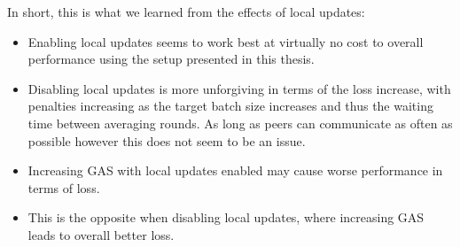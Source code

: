 In short, this is what we learned from the effects of local updates:
\begin{itemize}
    \item Enabling local updates seems to work best at virtually no cost to overall performance using the setup presented in this thesis.
    \item Disabling local updates is more unforgiving in terms of the loss increase, with penalties increasing as the target batch size increases and thus the waiting time between averaging rounds.
          As long as peers can communicate as often as possible however this does not seem to be an issue.
    \item Increasing GAS with local updates enabled may cause worse performance in terms of loss.
    \item This is the opposite when disabling local updates, where increasing GAS leads to overall better loss.
\end{itemize}
